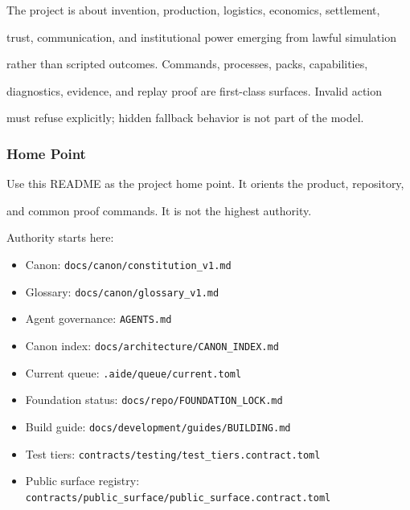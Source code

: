 \documentclass[9pt,a4paper,openany]{book}
\begin{document}
The project is about invention, production, logistics, economics, settlement,

trust, communication, and institutional power emerging from lawful simulation

rather than scripted outcomes.\allowbreak{} Commands, processes, packs, capabilities,

diagnostics, evidence, and replay proof are first-\allowbreak{}class surfaces.\allowbreak{} Invalid action

must refuse explicitly; hidden fallback behavior is not part of the model.\allowbreak{}


\subsubsection{Home Point}

Use this README as the project home point.\allowbreak{} It orients the product, repository,

and common proof commands.\allowbreak{} It is not the highest authority.\allowbreak{}


Authority starts here:


\begin{itemize}
\item Canon: \texttt{docs/\allowbreak{}canon/\allowbreak{}constitution\_\allowbreak{}v1.\allowbreak{}md}
\item Glossary: \texttt{docs/\allowbreak{}canon/\allowbreak{}glossary\_\allowbreak{}v1.\allowbreak{}md}
\item Agent governance: \texttt{AGENTS.\allowbreak{}md}
\item Canon index: \texttt{docs/\allowbreak{}architecture/\allowbreak{}CANON\_\allowbreak{}INDEX.\allowbreak{}md}
\item Current queue: \texttt{.\allowbreak{}aide/\allowbreak{}queue/\allowbreak{}current.\allowbreak{}toml}
\item Foundation status: \texttt{docs/\allowbreak{}repo/\allowbreak{}FOUNDATION\_\allowbreak{}LOCK.\allowbreak{}md}
\item Build guide: \texttt{docs/\allowbreak{}development/\allowbreak{}guides/\allowbreak{}BUILDING.\allowbreak{}md}
\item Test tiers: \texttt{contracts/\allowbreak{}testing/\allowbreak{}test\_\allowbreak{}tiers.\allowbreak{}contract.\allowbreak{}toml}
\item Public surface registry: \texttt{contracts/\allowbreak{}public\_\allowbreak{}surface/\allowbreak{}public\_\allowbreak{}surface.\allowbreak{}contract.\allowbreak{}toml}
\end{itemize}
\end{document}
